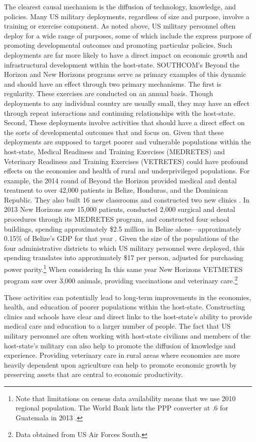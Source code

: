 \documentclass[12pt]{article}
\begin{document}
\begin{doublespace}
The clearest causal mechanism is the diffusion of technology, knowledge, and policies. Many US military deployments, regardless of size and purpose, involve a training or exercise component. As noted above, US military personnel often deploy for a wide range of purposes, some of which include the express purpose of promoting developmental outcomes and promoting particular policies. Such deployments are far more likely to have a direct impact on economic growth and infrastructural development within the host-state. SOUTHCOM's Beyond the Horizon and New Horizons programs serve as primary examples of this dynamic and should have an effect through two primary mechanisms. The first is regularity. These exercises are conducted on an annual basis. Though deployments to any individual country are usually small, they may have an effect through repeat interactions and continuing relationships with the host-state. Second, These deployments involve activities that should have a direct effect on the sorts of developmental outcomes that  and  focus on. Given that these deployments are supposed to target poorer and vulnerable populations within the host-state, Medical Readiness and Training Exercises (MEDRETES) and Veterinary Readiness and Training Exercises (VETRETES) could have profound effects on the economies and health of rural and underprivileged populations. For example, the 2014 round of Beyond the Horizon provided medical and dental treatment to over 42,000 patients in Belize, Honduras, and the Dominican Republic. They also built 16 new classrooms and constructed two new clinics \cite[21]{Kelly2015}. In 2013 New Horizons saw 15,000 patients, conducted 2,000 surgical and dental procedures through its MEDRETES program, and constructed four school buildings, spending approximately \$2.5 million in Belize alone---approximately 0.15\% of Belize's GDP for that year \cite{WDI2015}. Given the size of the populations of the four administrative districts to which US military personnel were deployed, this spending translates into approximately \$17 per person, adjusted for purchasing power parity.\footnote{Note that limitations on census data availability means that we use 2010 regional population. The World Bank lists the PPP converter at .6 for Guatemala in 2013 \cite{WDI2015}.}  When considering  In this same year New Horizons VETMETES program saw over 3,000 animals, providing vaccinations and veterinary care.\footnote{Data obtained from US Air Forces South.} 

These activities can potentially lead to long-term improvements in the economies, health, and education of poorer populations within the host-state.  Constructing clinics and schools have clear and direct links to the host-state's ability to provide medical care and education to a larger number of people. The fact that US military personnel are often working with host-state civilians and members of the host-state's military can also help to promote the diffusion of knowledge and experience. Providing veterinary care in rural areas where economies are more heavily dependent upon agriculture can help to promote economic growth by preserving assets that are central to economic productivity. 


\end{doublespace}
\end{document}

